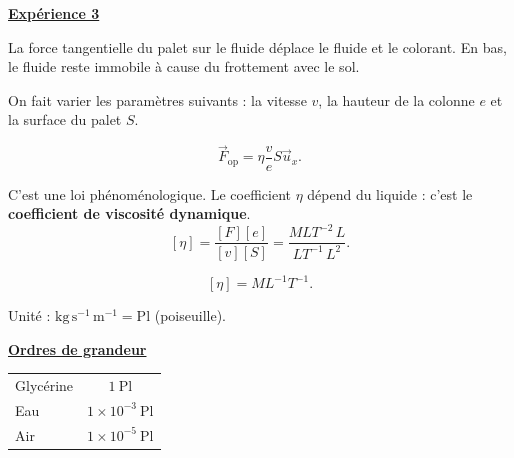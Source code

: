 \documentclass[11pt,a4paper]{article}
\newcommand{\vv}{\vec v}
\newcommand{\ux}{\vec u_x}\newcommand{\uy}{\vec u_y}\newcommand{\uz}{\vec u_z}
\newcommand{\titr}[1]{\par\needspace{4\baselineskip}\textbf{\underline{#1}}\par}
\begin{document}
\begin{exemple}
\titr{Expérience 3}
\begin{center}\end{center}
La force tangentielle du palet sur le fluide déplace le fluide et le colorant. En bas, le fluide reste immobile à cause du frottement avec le sol.

On fait varier les paramètres suivants : la vitesse $v$, la hauteur de la colonne $e$ et la surface du palet $S$.
\begin{cadre}\[\vec F_{\mathrm{op}}=\eta\frac veS\ux.\]\end{cadre}
C'est une loi phénoménologique. Le coefficient $\eta$ dépend du liquide : c'est le \textbf{coefficient de viscosité dynamique}.
\[ [\eta]=\frac{[F][e]}{[v][S]}=\frac{MLT^{-2}\,L}{LT^{-1}\,L^2}.\]
\begin{cadre}\[ [\eta]=ML^{-1}T^{-1}.\]\end{cadre}
Unité : $\mathrm{kg\,s^{-1}\,m^{-1}}=\mathrm{Pl}$ (poiseuille).
\titr{Ordres de grandeur}
\begin{center}\renewcommand{\arraystretch}{1.3}\begin{tabular}{l|c}
Glycérine & $1\ \mathrm{Pl}$\\
Eau & $1\times10^{-3}\ \mathrm{Pl}$\\
Air & $1\times10^{-5}\ \mathrm{Pl}$
\end{tabular}\end{center}
\end{exemple}
\end{document}
